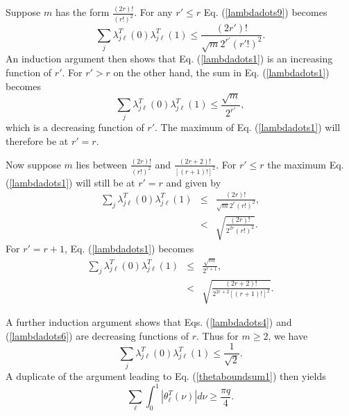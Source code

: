 \documentclass[twocolumn,amsmath,amssymb]{revtex4-1}
\begin{document}
Suppose $m$ has the form $\frac{(2r)!}{(r!)^2}$.
For any
$r' \le r$
Eq. (\ref{lambdadots9}) becomes
\begin{equation}
  \label{lambdadots1}
  \sum_j \lambda^T_{j \ell}(0) \lambda^T_{j \ell}(1) \le \frac{ (2 r')!}{\sqrt{m}2^{r'} (r'!)^2}.
\end{equation}
An induction argument then shows that Eq. (\ref{lambdadots1}) is an increasing
function of $r'$.
For $r' > r$ on the other hand, the sum in
Eq. (\ref{lambdadots1}) becomes
\begin{equation}
  \label{lambdadots2}
  \sum_j \lambda^T_{j \ell}(0) \lambda^T_{j \ell}(1) \le  \frac{ \sqrt{m}}{ 2^{r'}},
\end{equation}
which is a decreasing function of $r'$.
The maximum of Eq. (\ref{lambdadots1}) will therefore
be at $r' = r$.

Now suppose $m$ lies between $\frac{(2r)!}{(r!)^2}$ and $\frac{(2r + 2)!}{[(r+1)!]^2}$.
For $r' \le r$ the maximum Eq. (\ref{lambdadots1}) will still be at $r' = r$ and given by
\begin{subequations}
\begin{eqnarray}
  \label{lambdadots3}
  \sum_j \lambda^T_{j \ell}(0) \lambda^T_{j \ell}(1) & \le &  \frac{ (2 r)!}{\sqrt{m}2^{r} (r!)^2}, \\
      \label{lambdadots4}
      & < &\sqrt{ \frac{ (2 r)!}{2^{2r} (r!)^2}}.
\end{eqnarray}
\end{subequations}
For $r' = r + 1$, Eq. (\ref{lambdadots1}) becomes
\begin{subequations}
\begin{eqnarray}
  \label{lambdadots5}
  \sum_j \lambda^T_{j \ell}(0) \lambda^T_{j \ell}(1) & \le &   \frac{ \sqrt{m}}{ 2^{r+1}}, \\
  \label{lambdadots6}
& < & \sqrt{\frac{ (2 r+2)!}{2^{2r+2} [(r+1)!]^2}}.
\end{eqnarray}
\end{subequations}

A further induction argument shows that Eqs. (\ref{lambdadots4}) and (\ref{lambdadots6}) are
decreasing functions of $r$. 
Thus for $m \ge 2$,
we have
\begin{equation}
  \label{lambdadots7}
  \sum_j \lambda^T_{j \ell}(0) \lambda^T_{j \ell}(1) \le \frac{1}{\sqrt{2}}.
\end{equation}
A duplicate of the argument leading to Eq. (\ref{thetaboundsum1}) then
yields
\begin{equation}
\label{thetaboundsum5}
\sum_{\ell} \int_0^1 | \theta^T_{\ell}(\nu)| d \nu
\ge \frac{\pi q}{4}.
\end{equation}
\end{document}
